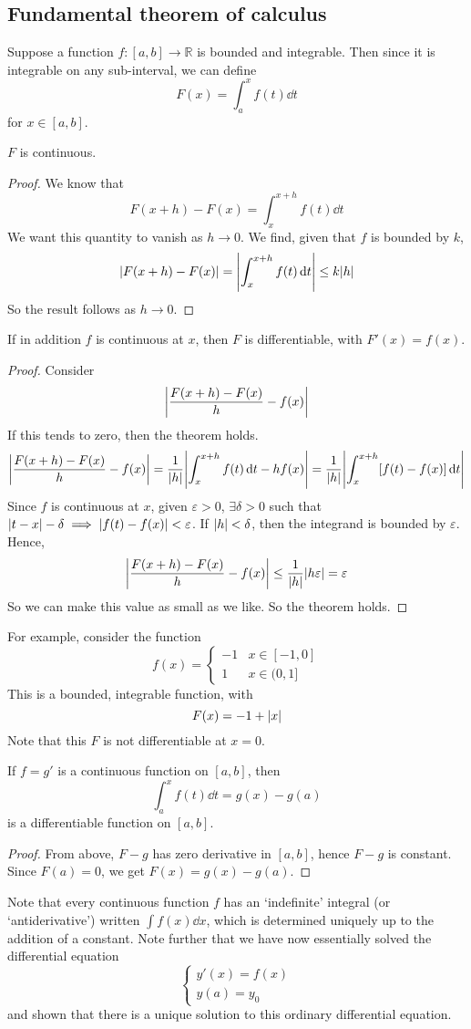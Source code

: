 \subsection{Fundamental theorem of calculus}
Suppose a function \(f \colon [a, b] \to \mathbb R\) is bounded and integrable.
Then since it is integrable on any sub-interval, we can define
\[
	F(x) = \int_a^x f(t) \dd{t}
\]
for \(x \in [a, b]\).
\begin{theorem}
	\(F\) is continuous.
\end{theorem}
\begin{proof}
	We know that
	\[
		F(x + h) - F(x) = \int_x^{x+h} f(t)\dd{t}
	\]
	We want this quantity to vanish as \(h \to 0\).
	We find, given that \(f\) is bounded by \(k\),
	\[
		\abs{F(x+h) - F(x)} = \abs{\int_x^{x+h} f(t) \dd{t}} \leq k\abs{h}
	\]
	So the result follows as \(h \to 0\).
\end{proof}
\begin{theorem}
	If in addition \(f\) is continuous at \(x\), then \(F\) is differentiable, with \(F'(x) = f(x)\).
\end{theorem}
\begin{proof}
	Consider
	\[
		\abs{\frac{F(x + h) - F(x)}{h} - f(x)}
	\]
	If this tends to zero, then the theorem holds.
	\[
		\abs{\frac{F(x + h) - F(x)}{h} - f(x)} = \frac{1}{\abs{h}} \abs{\int_x^{x+h} f(t) \dd{t} - hf(x)} = \frac{1}{\abs{h}} \abs{\int_x^{x+h} [f(t) - f(x)] \dd{t}}
	\]
	Since \(f\) is continuous at \(x\), given \(\varepsilon > 0\), \(\exists \delta > 0\) such that \(\abs{t - x} - \delta \implies \abs{f(t) - f(x)} < \varepsilon\).
	If \(\abs{h} < \delta\), then the integrand is bounded by \(\varepsilon\).
	Hence,
	\[
		\abs{\frac{F(x + h) - F(x)}{h} - f(x)} \leq \frac{1}{\abs{h}} \abs{h\varepsilon} = \varepsilon
	\]
	So we can make this value as small as we like.
	So the theorem holds.
\end{proof}
For example, consider the function
\[
	f(x) = \begin{cases}
		-1 & x \in [-1, 0] \\
		1  & x \in (0, 1]
	\end{cases}
\]
This is a bounded, integrable function, with
\[
	F(x) = -1 + \abs{x}
\]
Note that this \(F\) is not differentiable at \(x = 0\).
\begin{corollary}
	If \(f = g'\) is a continuous function on \([a, b]\), then
	\[
		\int_a^x f(t) \dd{t} = g(x) - g(a)
	\]
	is a differentiable function on \([a, b]\).
\end{corollary}
\begin{proof}
	From above, \(F - g\) has zero derivative in \([a, b]\), hence \(F - g\) is constant.
	Since \(F(a) = 0\), we get \(F(x) = g(x) - g(a)\).
\end{proof}
Note that every continuous function \(f\) has an `indefinite' integral (or `antiderivative') written \(\int f(x)\dd{x}\), which is determined uniquely up to the addition of a constant.
Note further that we have now essentially solved the differential equation
\[
	\left\{\begin{array}{l}
		y'(x) = f(x) \\
		y(a) = y_0
	\end{array}\right.
\]
and shown that there is a unique solution to this ordinary differential equation.
